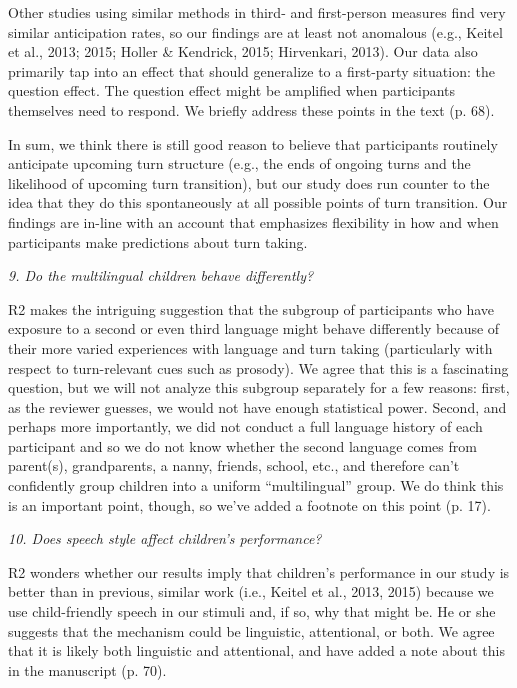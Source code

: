 \documentclass[11pt,a4paper]{letter} %
\begin{document}
\begin{letter}{}
\noindent Other studies using similar methods in third- and first-person measures find very similar anticipation rates, so our findings are at least not anomalous (e.g., Keitel et al., 2013; 2015; Holler \& Kendrick, 2015; Hirvenkari, 2013). Our data also primarily tap into an effect that should generalize to a first-party situation: the question effect. The question effect might be amplified when participants themselves need to respond. We briefly address these points in the text (p. 68).

\noindent In sum, we think there is still good reason to believe that participants routinely anticipate upcoming turn structure (e.g., the ends of ongoing turns and the likelihood of upcoming turn transition), but our study does run counter to the idea that they do this spontaneously at all possible points of turn transition. Our findings are in-line with an account that emphasizes flexibility in how and when participants make predictions about turn taking.

\noindent \textit{9. Do the multilingual children behave differently?}

\noindent R2 makes the intriguing suggestion that the subgroup of participants who have exposure to a second or even third language might behave differently because of their more varied experiences with language and turn taking (particularly with respect to turn-relevant cues such as prosody). We agree that this is a fascinating question, but we will not analyze this subgroup separately for a few reasons: first, as the reviewer guesses, we would not have enough statistical power. Second, and perhaps more importantly, we did not conduct a full language history of each participant and so we do not know whether the second language comes from parent(s), grandparents, a nanny, friends, school, etc., and therefore can't confidently group children into a uniform ``multilingual'' group. We do think this is an important point, though, so we've added a footnote on this point (p. 17).

\noindent \textit{10. Does speech style affect children's performance?}

\noindent R2 wonders whether our results imply that children's performance in our study is better than in previous, similar work (i.e., Keitel et al., 2013, 2015) because we use child-friendly speech in our stimuli and, if so, why that might be. He or she suggests that the mechanism could be linguistic, attentional, or both. We agree that it is likely both linguistic and attentional, and have added a note about this in the manuscript (p. 70).


\end{letter}
\end{document}
